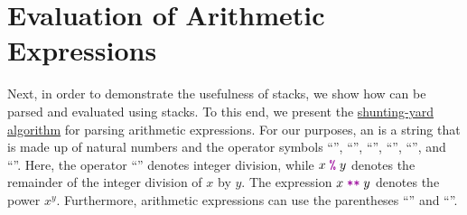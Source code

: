 \section{Evaluation of Arithmetic Expressions}
Next, in order to demonstrate the usefulness of stacks, we show how  can be
parsed and evaluated using stacks.  To this end, we present the
\href{https://en.wikipedia.org/wiki/Shunting-yard_algorithm}{shunting-yard algorithm}
 for parsing arithmetic expressions.  
For our purposes, an  is a string that is made up of natural numbers and
the operator symbols ``\mytt{+}'', ``\mytt{-}'', ``\mytt{*}'', ``\mytt{/}'',
``'', and ``\mytt{**}''. Here, the operator ``\mytt{/}'' denotes integer division,
while $x \;\mytt{\symbol{37}}\; y$ denotes the remainder of the integer division of $x$ by $y$.  The expression $x\;\mytt{**}\;y$ denotes the power $x^y$.
Furthermore, arithmetic expressions can use the parentheses ``\mytt{(}'' and ``\mytt{)}''.

